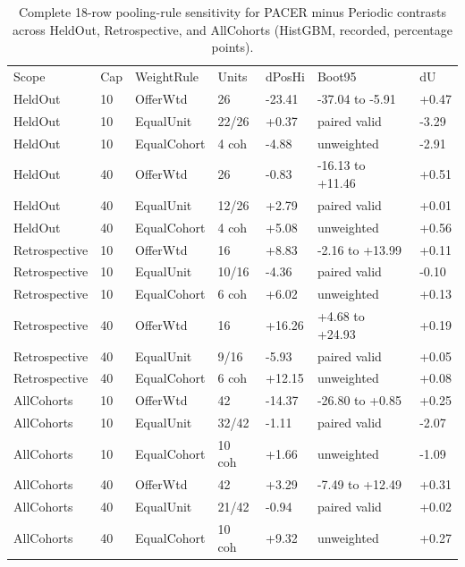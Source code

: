\begin{table}[!ht]
\centering\footnotesize\setlength{\tabcolsep}{3.5pt}
\caption{Complete 18-row pooling-rule sensitivity for PACER minus Periodic contrasts across HeldOut, Retrospective, and AllCohorts (HistGBM, recorded, percentage points).}
\begin{tabular}{lllllll}
\hline
Scope & Cap & WeightRule & Units & dPosHi & Boot95 & dU \\
HeldOut & 10 & OfferWtd & 26 & -23.41 & -37.04 to -5.91 & +0.47 \\
HeldOut & 10 & EqualUnit & 22/26 & +0.37 & paired valid & -3.29 \\
HeldOut & 10 & EqualCohort & 4 coh & -4.88 & unweighted & -2.91 \\
HeldOut & 40 & OfferWtd & 26 & -0.83 & -16.13 to +11.46 & +0.51 \\
HeldOut & 40 & EqualUnit & 12/26 & +2.79 & paired valid & +0.01 \\
HeldOut & 40 & EqualCohort & 4 coh & +5.08 & unweighted & +0.56 \\
Retrospective & 10 & OfferWtd & 16 & +8.83 & -2.16 to +13.99 & +0.11 \\
Retrospective & 10 & EqualUnit & 10/16 & -4.36 & paired valid & -0.10 \\
Retrospective & 10 & EqualCohort & 6 coh & +6.02 & unweighted & +0.13 \\
Retrospective & 40 & OfferWtd & 16 & +16.26 & +4.68 to +24.93 & +0.19 \\
Retrospective & 40 & EqualUnit & 9/16 & -5.93 & paired valid & +0.05 \\
Retrospective & 40 & EqualCohort & 6 coh & +12.15 & unweighted & +0.08 \\
AllCohorts & 10 & OfferWtd & 42 & -14.37 & -26.80 to +0.85 & +0.25 \\
AllCohorts & 10 & EqualUnit & 32/42 & -1.11 & paired valid & -2.07 \\
AllCohorts & 10 & EqualCohort & 10 coh & +1.66 & unweighted & -1.09 \\
AllCohorts & 40 & OfferWtd & 42 & +3.29 & -7.49 to +12.49 & +0.31 \\
AllCohorts & 40 & EqualUnit & 21/42 & -0.94 & paired valid & +0.02 \\
AllCohorts & 40 & EqualCohort & 10 coh & +9.32 & unweighted & +0.27 \\
\hline
\end{tabular}
\end{table}
